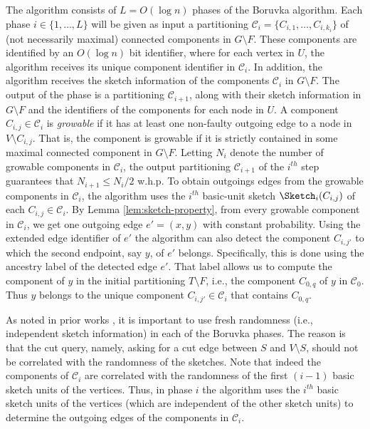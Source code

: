 The algorithm consists of $L=O(\log n)$ phases of the Boruvka algorithm. Each phase $i \in \{1,\ldots, L\}$ will be given as input a partitioning $\mathcal{C}_i=\{C_{i,1}, \ldots, C_{i,k_i}\}$ of (not necessarily maximal) connected components in $G \setminus F$.
These components are identified by an $O(\log n)$ bit identifier, where for each vertex in $U$, the algorithm receives its unique component identifier in  $\mathcal{C}_i$. In addition, the algorithm receives the sketch information of the components $\mathcal{C}_i$ in $G \setminus F$. The output of the phase is a partitioning $\mathcal{C}_{i+1}$, along with their sketch information in $G \setminus F$ and the identifiers of the components for each node in $U$. A component $C_{i,j} \in \mathcal{C}_i$ is \emph{growable} if it has at least one non-faulty outgoing edge to a node in $V \setminus C_{i,j}$. That is, the component is growable if it is strictly contained in some maximal connected component in $G \setminus F$. Letting $N_i$ denote the number of growable components in $\mathcal{C}_i$, the output partitioning $\mathcal{C}_{i+1}$ of the $i^{th}$ step guarantees that $N_{i+1}\leq N_i /2$ w.h.p. To obtain outgoings edges from the growable components in $\mathcal{C}_i$, the algorithm uses the $i^{th}$ basic-unit sketch $\Sketch_i(C_{i,j})$ of each $C_{i,j} \in \mathcal{C}_i$. By Lemma \ref{lem:sketch-property}, from every growable component in $\mathcal{C}_i$, we get one outgoing edge $e'=(x,y)$ with constant probability. Using the extended edge identifier of $e'$ the algorithm can also detect the component $C_{i,j'}$ to which the second endpoint, say $y$, of $e'$ belongs. Specifically, this is done using the ancestry label of the detected edge $e'$. That label allows us to compute the component of $y$ in the initial partitioning $T \setminus F$, i.e., the component $C_{0,q}$ of $y$ in $\mathcal{C}_0$. Thus $y$ belongs to the unique component $C_{i,j'} \in \mathcal{C}_i$ that contains 
$C_{0,q}$. 



As noted in prior works \cite{ahn2012analyzing,kapron2013dynamic,DuanConnectivityArxiv16}, it is important to use fresh randomness (i.e., independent sketch information) in each of the Boruvka phases. The reason is that the cut query, namely, asking for a cut edge between $S$ and $V \setminus S$, should not be correlated with the randomness of the sketches. Note that indeed the components of $\mathcal{C}_i$ are correlated with the randomness of the first $(i-1)$ basic sketch units of the vertices. Thus, in phase $i$ the algorithm uses the $i^{th}$ basic sketch units of the vertices (which are independent of the other sketch units) to determine the outgoing edges of the components in $\mathcal{C}_i$.


